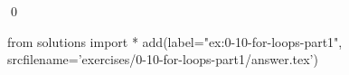 
\begin{ex}
  \label{ex:0-10-for-loops-part1}
  
  \qed
\end{ex}
\begin{python0}
from solutions import *
add(label="ex:0-10-for-loops-part1",
    srcfilename='exercises/0-10-for-loops-part1/answer.tex')
\end{python0}
